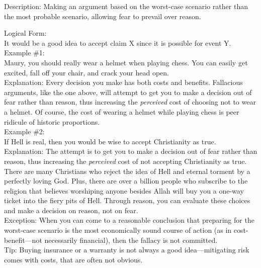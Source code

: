 \documentclass[a4paper,12pt,single,pdftex]{scrbook}
\begin{document}
  
    Description: Making an argument based on the worst-case scenario rather than the most probable scenario, allowing fear to prevail over reason.

    
      Logical Form:
    \\

    
      It would be a good idea to accept claim X since it is possible for event Y.
    \\

    
      Example \#1:
    \\

    
      Maury, you should really wear a helmet when playing chess.  You can easily get excited, fall off your chair, and crack your head open.
    \\

    
      Explanation: Every decision you make has both costs and benefits.  Fallacious arguments, like the one above, will attempt to get you to make a decision out of fear rather than reason, thus increasing the {\it perceived}  cost of choosing not to wear a helmet.  Of course, the cost of wearing a helmet while playing chess is peer ridicule of historic proportions.
    \\

    
      Example \#2:
    \\

    
      If Hell is real, then you would be wise to accept Christianity as true.
    \\

    
      Explanation: The attempt is to get you to make a decision out of fear rather than reason, thus increasing the {\it perceived} cost of not accepting Christianity as true.  There are many Christians who reject the idea of Hell and eternal torment by a perfectly loving God.  Plus, there are over a billion people who subscribe to the religion that believes worshiping anyone besides Allah will buy you a one-way ticket into the fiery pits of Hell.  Through reason, you can evaluate these choices and make a decision on reason, not on fear.
    \\

    
      Exception: When you can come to a reasonable conclusion that preparing for the worst-case scenario is the most economically sound course of action (as in cost-benefit—not necessarily financial), then the fallacy is not committed.
    \\

    
      Tip: Buying insurance or a warranty is not always a good idea—mitigating risk comes with costs, that are often not obvious.
    \\
\end{document}

